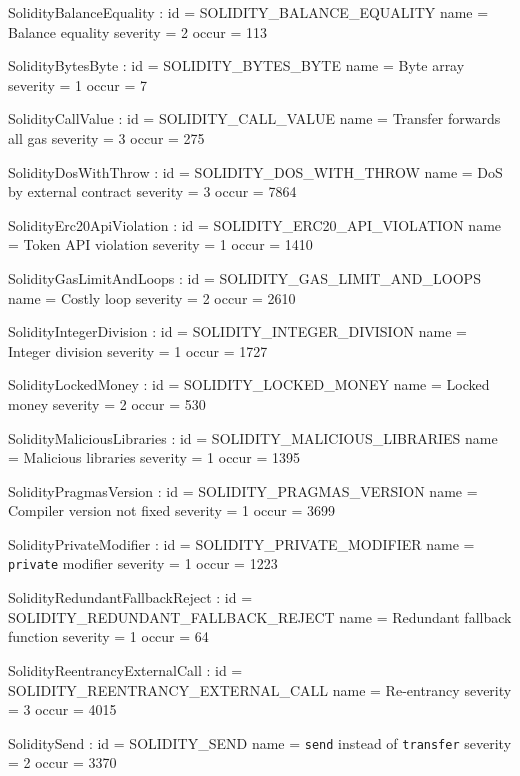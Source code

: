 

\let\letcs\texapiletcs %

\setparameter SolidityBalanceEquality :
id 			= SOLIDITY\_BALANCE\_EQUALITY
name 		= {Balance equality}
severity 	= 2
occur	= 113

\setparameter SolidityBytesByte :
id 			= SOLIDITY\_BYTES\_BYTE
name 		= {Byte array}
severity 	= 1
occur	= 7

\setparameter SolidityCallValue :
id 			= SOLIDITY\_CALL\_VALUE
name 		= {Transfer forwards all gas}
severity 	= 3
occur	= 275

\setparameter SolidityDosWithThrow :
id 			= SOLIDITY\_DOS\_WITH\_THROW
name 		= {DoS by external contract}
severity 	= 3
occur	= 7864

\setparameter SolidityErc20ApiViolation :
id 			= SOLIDITY\_ERC20\_API\_VIOLATION
name 		= {Token API violation}
severity 	= 1
occur	= 1410

\setparameter SolidityGasLimitAndLoops :
id 			= SOLIDITY\_GAS\_LIMIT\_AND\_LOOPS
name 		= {Costly loop}
severity 	= 2
occur	= 2610

\setparameter SolidityIntegerDivision :
id 			= SOLIDITY\_INTEGER\_DIVISION
name 		= {Integer division}
severity 	= 1
occur	= 1727

\setparameter SolidityLockedMoney :
id 			= SOLIDITY\_LOCKED\_MONEY
name 		= {Locked money}
severity 	= 2
occur	= 530

\setparameter SolidityMaliciousLibraries :
id 			= SOLIDITY\_MALICIOUS\_LIBRARIES
name 		= {Malicious libraries}
severity 	= 1
occur	= 1395

\setparameter SolidityPragmasVersion :
id 			= SOLIDITY\_PRAGMAS\_VERSION
name 		= {Compiler version not fixed}
severity 	= 1
occur	= 3699

\setparameter SolidityPrivateModifier :
id 			= SOLIDITY\_PRIVATE\_MODIFIER
name 		= {\texttt{private} modifier}
severity 	= 1
occur	= 1223

\setparameter SolidityRedundantFallbackReject :
id 			= SOLIDITY\_REDUNDANT\_FALLBACK\_REJECT
name 		= {Redundant fallback function}
severity 	= 1
occur	= 64

\setparameter SolidityReentrancyExternalCall :
id 			= SOLIDITY\_REENTRANCY\_EXTERNAL\_CALL
name 		= {Re-entrancy}
severity 	= 3
occur	= 4015

\setparameter SoliditySend :
id 			= SOLIDITY\_SEND
name 		= {\texttt{send} instead of \texttt{transfer}}
severity 	= 2
occur	= 3370

